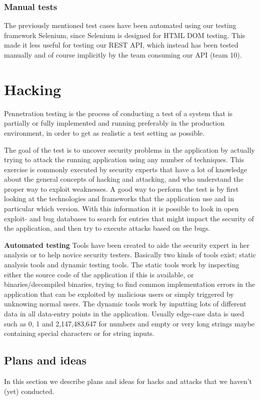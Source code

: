 \documentclass[a4paper]{article}
\begin{document}
\subsubsection{Manual tests}
The previously mentioned test cases have been automated using our testing framework Selenium, since Selenium is designed for HTML DOM testing. This made it less useful for testing our REST API, which instead has been tested manually and of course implicitly by the team consuming our API (team 10).

\section{Hacking}
Pennetration testing is the process of conducting a test of a system that is partially or fully implemented and running preferably in the production environment, in order to get as realistic a test setting as possible.

The goal of the test is to uncover security problems in the application by actually trying to attack the running application using any number of techniques. This exercise is commonly executed by security experts that have a lot of knowledge about the general concepts of hacking and attacking, and who understand the proper way to exploit weaknesses. 
A good way to perform the test is by first looking at the technologies and frameworks that the application use and in particular which version. With this information it is possible to look in open exploit- and bug databases to search for entries that might impact the security of the application, and then try to execute attacks based on the bugs.

\textbf{Automated testing}
Tools have been created to aide the security expert in her analysis or to help novice security testers. Basically two kinds of tools exist; static analysis tools and dynamic testing tools.
The static tools work by inspecting either the source code of the application if this is available, or binaries/decompiled binaries, trying to find common implementation errors in the application that can be exploited by malicious users or simply triggered by unknowing normal users.
The dynamic tools work by inputting lots of different data in all data-entry points in the application. Usually edge-case data is used such as 0, 1 and 2,147,483,647 for numbers and empty or very long strings maybe containing special characters or for string inputs.

\subsection{Plans and ideas}
In this section we describe plans and ideas for hacks and attacks that we haven't (yet) conducted.
\end{document}
